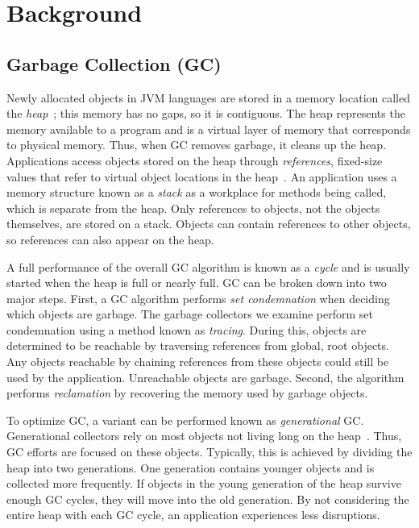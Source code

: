 \documentclass{sig-alternate}
\begin{document}
\section{Background}
\label{sec:background}


\subsection{Garbage Collection (GC)}
\label{sec:garbageCollection}

Newly allocated objects in JVM languages are stored in a memory location called
the \emph{heap}~\cite{oracle:heap}; this memory has no gaps, so it is contiguous. The heap represents the memory available to a program and is a virtual layer of memory that corresponds to physical memory.
Thus, when GC removes garbage, it cleans up the heap.
Applications access objects stored on the heap through \emph{references},
fixed-size values that refer to virtual object locations in the heap~\cite{Lindblom:2011}. 
An application uses a memory structure known
as a \emph{stack} as a workplace for methods being called, 
which is separate from the heap.
Only references to objects, not the objects themselves,
are stored on a stack.
Objects can contain references to other objects, so references can also appear on the heap.

A full
performance of the overall GC algorithm is known as a \emph{cycle} and
is usually started when the heap is full or nearly full. GC can be broken down into two major steps.
First, a GC algorithm performs \emph{set condemnation} when deciding which objects are 
garbage. The garbage collectors we examine perform set condemnation using a method 
known as \emph{tracing}. During this, objects are determined to be reachable by 
traversing references from global, root objects. Any objects reachable by chaining references
from these objects could still be used by the application. 
Unreachable objects are garbage. Second, the algorithm performs 
\emph{reclamation} by recovering the memory used by garbage objects.

To optimize GC, a variant can be performed known as \emph{generational} GC.
Generational collectors rely on most objects not living long on the 
heap~\cite{Tene:C4}. Thus, GC efforts are focused on these objects. Typically, this is achieved
by dividing the heap into two generations. One generation contains younger objects and
is collected more frequently. If objects in the young generation of the heap survive
enough GC cycles, they will move into the old generation. By not considering the entire
heap with each GC cycle, an application experiences less disruptions.
\end{document}
